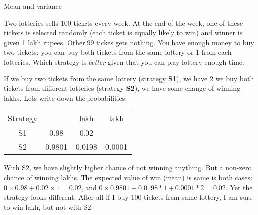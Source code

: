 \documentclass[a4paper,9pt, addpoints, solutions]{exam}
\begin{document}
\begin{questions}

    \question Mean and variance

\question[10]
Two lotteries sells 100 tickets every week. At the end of the week, one of these
tickets is selected randomly (each ticket is equally likely to win) and winner
is given 1 lakh rupees. Other 99 tickes gets nothing. You have enough money to
buy two tickets: you can buy both tickets from the same lottery or 1 from each
lotteries. Which strategy is \textit{better} given that you can play lottery enough
time.

\begin{solution} 
    If we buy two tickets from the same lottery (strategy \textbf{S1}), we have
    2%
    we buy both tickets from different lotteries (strategy \textbf{S2}), we have
    some change of winning  lakhs. Lets write down the probabilities.

    \begin{tabular}{c c c c}
        Strategy                    & \rupee 0     & \rupee 1 lakh & \rupee 2 lakh \\
        S1                          & 0.98         & 0.02          & \\
        S2                          & 0.9801       & 0.0198        & 0.0001 \\
    \end{tabular}

    With S2, we have slightly higher chance of not winning anything. But a non-zero
    chance of winning  lakhs. The expected value of win (mean) is same is
    both cases: $0 \times 0.98 + 0.02 \times 1 = 0.02$, and $0\times 0.9801 + 0.0198
    * 1 + 0.0001 * 2 = 0.02$. Yet the strategy looks different. After all if I buy
    100 tickets from same lottery, I am sure to win  lakh, but not with S2.


\end{solution}
\end{questions}
\end{document}
